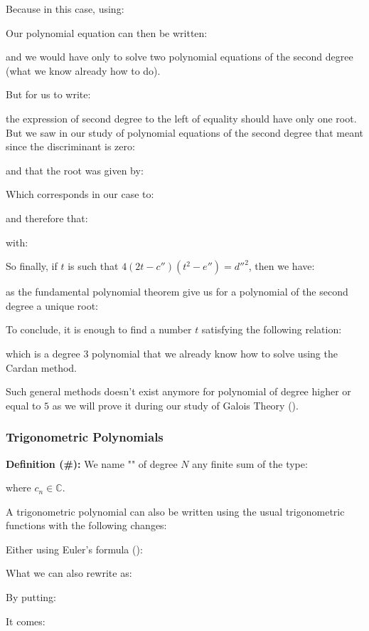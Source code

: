 	Because in this case, using:
	
	Our polynomial equation can then be written:
	
	and we would have only to solve two polynomial equations of the second degree (what we know already how to do).
	
	But for us to write:
	
	the expression of second degree to the left of equality should have only one root. But we saw in our study of polynomial equations of the second degree that meant since the discriminant is zero:
	
	and that the root was given by:
	
	Which corresponds in our case to:
	
	and therefore that:
	
	with:
	
	So finally, if $t$ is such that $4(2t-c'')(t^2-e'')={d''}^2$, then we have:
	
	as the fundamental polynomial theorem give us for a polynomial of the second degree a unique root:
	
	To conclude, it is enough to find a number $t$ satisfying the following relation:
	
	which is a degree $3$ polynomial that we already know how to solve using the Cardan method.

	Such general methods doesn't exist anymore for polynomial of degree higher or equal to $5$ as we will prove it during our study of Galois Theory ().
	
	\subsubsection{Trigonometric Polynomials}\label{trigonometric polynomials}
	\textbf{Definition (\#\mydef):} We name "" of degree $N$ any finite sum of the type:
	
	where $c_n\in \mathbb{C}$.

	A trigonometric polynomial can also be written using the usual trigonometric functions with the following changes:
	
	Either using Euler's formula ():
	
	What we can also rewrite as:
	
	By putting:
	
	It comes:
	
